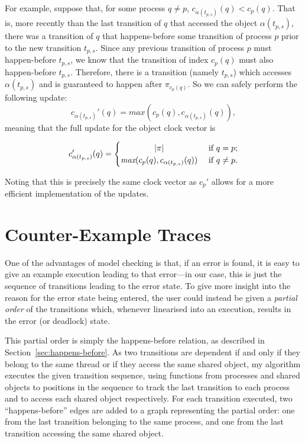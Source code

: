 \documentclass[12pt,a4paper,twoside,openany]{report}
\begin{document}
For example, suppose that,
for some process $q \neq p$,
$c_{\alpha(t_{p,s})}(q) < c_p(q)$. That is,
more recently than the last transition of
$q$ that accessed the object $\alpha(t_{p,s})$,
there was a transition of $q$ that happens-before
some transition of process $p$ prior to the new
transition $t_{p,s}$. Since any previous
transition of process $p$ must happen-before
$t_{p,s}$, we know that the transition
of index $c_p(q)$ must also happen-before
$t_{p,s}$. Therefore, there is a transition
(namely $t_{p,s}$) which
accesses $\alpha(t_{p,s})$ and is guaranteed
to happen after $\pi_{c_p(q)}$. So we can
safely perform the following update:
\[ c_{\alpha(t_{p,s})}'(q) =\textit{max}(c_p(q),
c_{\alpha(t_{p,s})}(q)),
\]
meaning that the full update for the object
clock vector is

\[ c_{\alpha(t_{p,s})}'(q) =
\begin{cases}
\hfill |\pi| \hfill & \text{ if } q = p; \\
\hfill \textit{max}(c_p(q),
c_{\alpha(t_{p,s})}(q))
\hfill & \text{ if } q \neq p.
\end{cases}\]

Noting that this is precisely the same
clock vector as $c_p'$ allows for a
more efficient implementation of
the updates.

\section{Counter-Example Traces} \label{sec:traces}
One of the advantages of model checking
is that, if
an error is found, it is easy to
give an example execution leading
to that error---in
our case, this is just the sequence of
transitions leading to the error state.
To give more insight into the reason for the
error state being entered, the user could
instead be given a
\emph{partial order} of the transitions which,
whenever linearised into an execution,
results in the error (or deadlock) state.

This partial order is simply the happens-before
relation, as described in
Section~\ref{sec:happens-before}. As
two transitions are dependent if and only
if they belong to the same thread or if
they access the same shared object, my
algorithm executes the given transition
sequence, using functions from processes
and shared objects to positions in
the sequence to track the last
transition to each process and
to access each shared object respectively.
For each
transition executed, two ``happens-before''
edges are added
to a graph representing the partial
order: one from the last transition
belonging to the same process, and one
from the last transition accessing the
same shared object.
\end{document}
